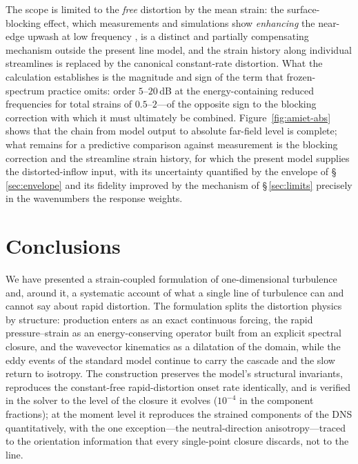 \documentclass[lineno]{JFM-FLM_Au}
\begin{document}
The scope is limited to the \emph{free} distortion by the mean strain: the
surface-blocking effect, which measurements and simulations show
\emph{enhancing} the near-edge upwash at low frequency
\citep{HuntGraham1978,dosSantos2023,Piccolo2024}, is a distinct and
partially compensating mechanism outside the present line model, and
the strain history along individual streamlines is replaced by the
canonical constant-rate distortion. What the calculation establishes
is the magnitude and sign of the term that frozen-spectrum practice omits: order $5$--$20$\,dB at the
energy-containing reduced frequencies for total strains of
$0.5$--$2$---of the opposite sign to the
blocking correction with which it must ultimately be combined.
Figure~\ref{fig:amiet-abs} shows that the chain from model output to absolute far-field level is complete; what remains for a
predictive comparison against measurement is the blocking correction
and the streamline strain history, for which the present model
supplies the distorted-inflow input, with its
uncertainty quantified by the envelope of \S\,\ref{sec:envelope} and
its fidelity improved by the mechanism of \S\,\ref{sec:limits}
precisely in the wavenumbers the response weights.

\section{Conclusions}\label{sec:conclusions}

We have presented a strain-coupled formulation of one-dimensional
turbulence and, around it, a systematic account of what a single line of
turbulence can and cannot say about rapid distortion. The formulation
splits the distortion physics by structure: production enters as an
exact continuous forcing, the rapid pressure--strain as an
energy-conserving operator built from an explicit spectral closure, and
the wavevector kinematics as a dilatation of the domain, while the eddy
events of the standard model continue to carry the cascade and the slow
return to isotropy. The construction preserves the model's structural
invariants, reproduces the constant-free rapid-distortion onset rate
identically, and is verified in the solver to the level of the closure
it evolves ($10^{-4}$ in the component fractions); at the moment level
it reproduces the strained components of the \citet{LeeReynolds1985}
DNS quantitatively, with the one exception---the neutral-direction
anisotropy---traced to the orientation information that every
single-point closure discards, not to the line.
\end{document}
